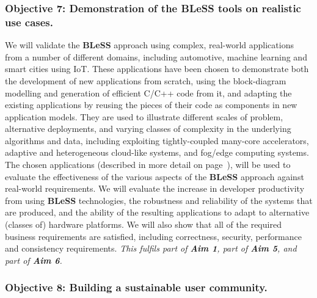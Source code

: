 \documentclass[a4paper,11pt]{article}
\newcommand{\project}[1]{\textbf{#1}\xspace}
\newcommand{\BLESS}{\project{BLeSS}}
\newcommand{\TheProject}{\BLESS}
\begin{document}
\subsubsection*{Objective 7: Demonstration of the \TheProject{} tools on realistic use cases.}
\vspace{-6pt}

We will validate the \TheProject{} approach using complex, real-world applications from a number of
different domains, 
including automotive, machine learning and smart cities using IoT. These applications have been chosen to 
demonstrate both the development of new applications from scratch, using the block-diagram modelling and 
generation of efficient C/C++ code from it, and adapting the existing applications by reusing the pieces of
their code as components in new application models. 
They are used to illustrate different scales of problem, alternative deployments, and varying classes of complexity in the
underlying algorithms and data, including exploiting tightly-coupled many-core
accelerators, adaptive and heterogeneous cloud-like systems, and fog/edge computing systems.
%
The chosen applications (described in more detail on page~\pageref{sect:applications}),
will be used to evaluate the effectiveness of the various aspects of the \TheProject{} approach against real-world requirements.
We will evaluate the increase in developer productivity from using \TheProject{} technologies,
the robustness and reliability of the systems that are produced,  and the ability of the resulting applications to adapt to alternative
(classes of) hardware platforms.
We will also show that all of the required business requirements are satisfied,
including correctness, security, performance and consistency requirements.
\newline
\emph{This fulfils part of \textbf{Aim 1}, part of \textbf{Aim 5}, and part of \textbf{Aim 6}.}

\subsubsection*{Objective 8: Building a sustainable user community.}
\vspace{-6pt}
\end{document}
